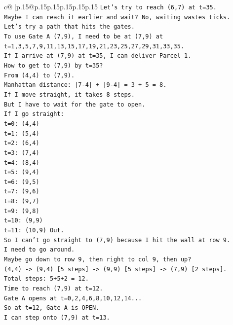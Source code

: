 \documentclass{article}
\begin{document}
{\begin{supertabular}{c@{$\;$}|p{.15\linewidth}@{}p{.15\linewidth}p{.15\linewidth}p{.15\linewidth}p{.15\linewidth}p{.15\linewidth}}
{{{\texttt{Let's try to reach (6,7) at t=35.} \\
\texttt{Maybe I can reach it earlier and wait? No, waiting wastes ticks.} \\
\texttt{Let's try a path that hits the gates.} \\
\texttt{To use Gate A (7,9), I need to be at (7,9) at t=1,3,5,7,9,11,13,15,17,19,21,23,25,27,29,31,33,35.} \\
\texttt{If I arrive at (7,9) at t=35, I can deliver Parcel 1.} \\
\texttt{How to get to (7,9) by t=35?} \\
\texttt{From (4,4) to (7,9).} \\
\texttt{Manhattan distance: |7{-}4| + |9{-}4| = 3 + 5 = 8.} \\
\texttt{If I move straight, it takes 8 steps.} \\
\texttt{But I have to wait for the gate to open.} \\
\texttt{If I go straight:} \\
\texttt{t=0: (4,4)} \\
\texttt{t=1: (5,4)} \\
\texttt{t=2: (6,4)} \\
\texttt{t=3: (7,4)} \\
\texttt{t=4: (8,4)} \\
\texttt{t=5: (9,4)} \\
\texttt{t=6: (9,5)} \\
\texttt{t=7: (9,6)} \\
\texttt{t=8: (9,7)} \\
\texttt{t=9: (9,8)} \\
\texttt{t=10: (9,9)} \\
\texttt{t=11: (10,9) Out.} \\
\texttt{So I can't go straight to (7,9) because I hit the wall at row 9.} \\
\texttt{I need to go around.} \\
\texttt{Maybe go down to row 9, then right to col 9, then up?} \\
\texttt{(4,4) {-}> (9,4) {[}5 steps{]} {-}> (9,9) {[}5 steps{]} {-}> (7,9) {[}2 steps{]}.} \\
\texttt{Total steps: 5+5+2 = 12.} \\
\texttt{Time to reach (7,9) at t=12.} \\
\texttt{Gate A opens at t=0,2,4,6,8,10,12,14...} \\
\texttt{So at t=12, Gate A is OPEN.} \\
\texttt{I can step onto (7,9) at t=13.} \\
}}}
\end{supertabular}}
\end{document}
